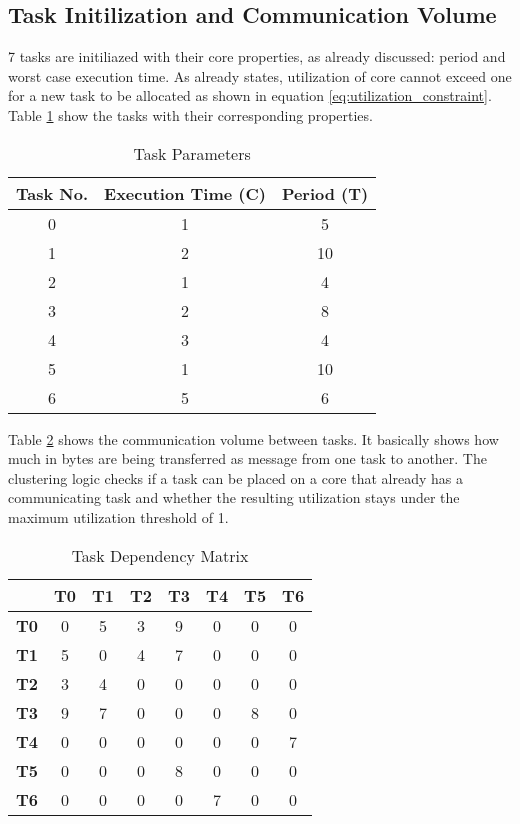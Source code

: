 \documentclass[conference]{IEEEtran}
\begin{document}
\subsection{Task Initilization and Communication Volume}
\label{subsec: initialization}
7 tasks are initiliazed with their core properties, as already discussed: period and worst case execution time. As already states, utilization of core cannot exceed one for a new task to be allocated as shown in equation \ref{eq:utilization_constraint}. Table \ref{tab:task_parameters} show the tasks with their corresponding properties. 

\begin{table}[htbp]
\centering
\caption{Task Parameters}
\label{tab:task_parameters}
\begin{tabular}{|c|c|c|}
\hline
\textbf{Task No.} & \textbf{Execution Time (C)} & \textbf{Period (T)} \\
\hline
0 & 1 & 5 \\
1 & 2 & 10 \\
2 & 1 & 4 \\
3 & 2 & 8 \\
4 & 3 & 4 \\
5 & 1 & 10 \\
6 & 5 & 6 \\
\hline
\end{tabular}
\end{table}

Table \ref{tab:task_dependency_matrix} shows the communication volume between tasks. It basically shows how much in bytes are being transferred as message from one task to another. The clustering logic checks if a task can be placed on a core that already has a communicating task and whether the resulting utilization stays under the maximum utilization threshold of 1.


\begin{table}[htbp]
\centering
\caption{Task Dependency Matrix}
\label{tab:task_dependency_matrix}
\setlength{\tabcolsep}{2pt} %
\renewcommand{\arraystretch}{2} %
\begin{tabular}{|c|c|c|c|c|c|c|c|}
\hline
 & \textbf{T0} & \textbf{T1} & \textbf{T2} & \textbf{T3} & \textbf{T4} & \textbf{T5} & \textbf{T6} \\
\hline
\textbf{T0} & 0 & 5 & 3 & 9 & 0 & 0 & 0 \\
\textbf{T1} & 5 & 0 & 4 & 7 & 0 & 0 & 0 \\
\textbf{T2} & 3 & 4 & 0 & 0 & 0 & 0 & 0 \\
\textbf{T3} & 9 & 7 & 0 & 0 & 0 & 8 & 0 \\
\textbf{T4} & 0 & 0 & 0 & 0 & 0 & 0 & 7 \\
\textbf{T5} & 0 & 0 & 0 & 8 & 0 & 0 & 0 \\
\textbf{T6} & 0 & 0 & 0 & 0 & 7 & 0 & 0 \\
\hline
\end{tabular}
\end{table}
\end{document}
